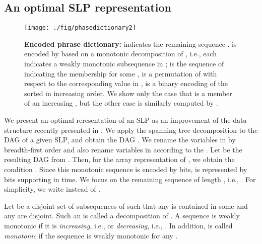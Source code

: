 \documentclass[10pt]{llncs}
\begin{document}
\subsection{An optimal SLP representation}
\begin{figure}[t]
\begin{center}
\texttt{[image: ./fig/phasedictionary2]}
\end{center}
\vspace{-.5cm}
\caption{
{\bf Encoded phrase dictionary:}
 indicates the remaining sequence .
 is encoded by 
based on a monotonic decomposition  of , i.e.,
each  indicates a weakly monotonic subsequence in ;
 is the sequence of  indicating the membership for some ,
 is a permutation of  with respect to 
the corresponding value in ,
 is a binary encoding of the sorted  in increasing order.
We show only the case that  is a member of an increasing , but 
the other case is similarly computed by .
}
\label{dic_enc}
\end{figure}

We present an optimal reresentation of an SLP as an improvement of the data structure recently presented in \cite{Takabatake2012}.
We apply the spanning tree decomposition to the DAG  of a given SLP, and obtain the DAG .
We rename the variables in  by breadth-first order 
and also rename variables in  according to the .
Let  be the resulting DAG from . 
Then, for the array representation  of , we obtain
the condition .
Since this monotonic sequence is encoded by  bits,
 is represented by  bits supporting
  in  time.
We focus on the remaining sequence of length , i.e., .
For simplicity, we write  instead of . 

Let  be a disjoint set of subsequences of  such that 
any  is contained in some  and any   are disjoint.
Such an  is called a decomposition of .
A sequence  is weakly monotonic 
if it is {\em increasing}, i.e.,  or {\em decreasing}, i.e., .
In addition,  is called {\em monotonic} if the sequence  is weakly monotonic 
for any .
\end{document}

